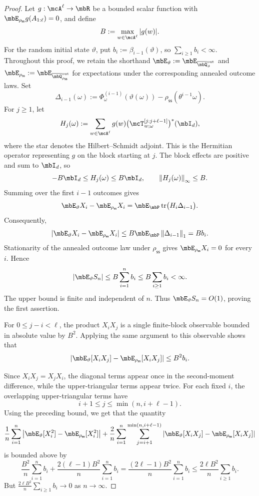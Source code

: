 \documentclass[10pt,a4paper]{amsart}
\numberwithin{equation}{section}   %
\theoremstyle{plain}   %
\theoremstyle{plain}   %
\theoremstyle{examplestyle}
\DeclareMathOperator{\pr}{\mbP}           %
\newcommand{\s}{\rho_{\mathsf{ss}}}     %
\DeclareMathOperator{\str}{tr} %
\newcommand{\unorm}[1]{\left\lVert#1\right\rVert}
\begin{document}
\begin{proof}
    Let $g:\mcA^\ell\to\mbR$ be a bounded scalar function with  $\mbE_{\s}g(A_{1:\ell})=0$, and define
    \[
        B:=\max_{w\in\mcA^\ell}|g(w)|.
    \]
    For the random initial state $\vartheta$, put $b_i:=\beta_{i-1}(\vartheta)$, so $\sum_{i\ge1}b_i<\infty$.
    Throughout this proof, we retain the shorthand $\mbE_\vartheta :=\mbE_{\overline\mbQ^{\mathrm{out}}_\vartheta}$ and $\mbE_{\s} :=\mbE_{\overline\mbQ^{\mathrm{out}}_{\s}}$ for expectations under the corresponding annealed outcome laws.
    Set
    \[
        \Delta_{i-1}(\omega)
        :=
        \Phi^{(i-1)}_\omega(\vartheta(\omega))
        -
        \s(\theta^{i-1}\omega).
    \]
    For $j\ge1$, let
    \[
        H_j(\omega)
        :=
        \sum_{w\in\mcA^\ell}
            g(w)
            \bigl(\mcT^{[j:j+\ell-1]}_{w;\omega}\bigr)^*
            (\mbI_d),
    \]
    where the star denotes the Hilbert--Schmidt adjoint.
    This is the Hermitian operator representing $g$ on the block starting at $j$.
    The block effects are positive and sum to $\mbI_d$, so
    \[
        -B\mbI_d\le H_j(\omega)\le B\mbI_d,
        \qquad
        \unorm{H_j(\omega)}_\infty\le B.
    \]
    Summing over the first $i-1$ outcomes gives
    \[
        \mbE_\vartheta X_i-\mbE_{\s}X_i
        =
        \mbE_{\pr}
            \str\bigl(H_i\Delta_{i-1}\bigr).
    \]
    Consequently,
    \[
        |\mbE_\vartheta X_i-\mbE_{\s}X_i|
        \le
        B\mbE_{\pr}\unorm{\Delta_{i-1}}_1
        =
        Bb_i.
    \]
    Stationarity of the annealed outcome law under $\s$ gives $\mbE_{\s}X_i=0$ for every $i$. 
    Hence
    \[
        |\mbE_\vartheta S_n|
        \le
        B\sum_{i=1}^n b_i
        \le
        B\sum_{i\ge1}b_i<\infty.
    \]
    The upper bound is finite and independent of $n$.
    Thus $\mbE_\vartheta S_n=O(1)$, proving the first assertion.

    For $0\le j-i<\ell$, the product $X_iX_j$ is a single finite-block observable bounded in absolute value by $B^2$.
    Applying the same argument to this observable shows that
    \[
        \left|
            \mbE_\vartheta[X_iX_j]
            -
            \mbE_{\s}[X_iX_j]
        \right|
        \le B^2b_i.
    \]

    Since $X_iX_j=X_jX_i$, the diagonal terms appear once in the second-moment difference, while the upper-triangular terms appear twice. For each fixed $i$, the overlapping upper-triangular terms have
    \[
        i+1\le j\le\min(n,i+\ell-1).
    \]
    Using the preceding bound, we get that the quantity 
    \[
        \frac1n\sum_{i=1}^n
            \left|
                \mbE_\vartheta[X_i^2]
                -
                \mbE_{\s}[X_i^2]
            \right|
        +
        \frac2n\sum_{i=1}^n
        \sum_{j=i+1}^{\min(n,i+\ell-1)}
            \left|
                \mbE_\vartheta[X_iX_j]
                -
                \mbE_{\s}[X_iX_j]
            \right|
    \]
    is bounded above by 
    \[
        \frac{B^2}{n}\sum_{i=1}^n b_i
        +
        \frac{2(\ell-1)B^2}{n}\sum_{i=1}^n b_i
        =
        \frac{(2\ell-1)B^2}{n}\sum_{i=1}^n b_i
        \le
        \frac{2\ell B^2}{n}\sum_{i\ge1}b_i.
    \]
    But $\frac{2\ell B^2}{n}\sum_{i\ge1}b_i\to 0$ as $n\to\infty$. 


\end{proof}
\end{document}
